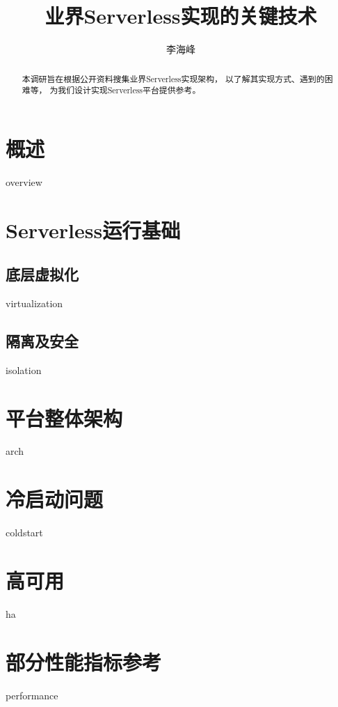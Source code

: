 \documentclass{scrartcl}
\title{业界Serverless实现的关键技术}
\author{李海峰}
\begin{document}
\begin{titlingpage}
\maketitle
\begin{abstract}
    本调研旨在根据公开资料搜集业界Serverless实现架构，
    以了解其实现方式、遇到的困难等，
    为我们设计实现Serverless平台提供参考。
\end{abstract}
\end{titlingpage}
\tableofcontents

\section{概述}
{overview}
\section{Serverless运行基础}
\subsection{底层虚拟化}
{virtualization}
\subsection{隔离及安全}
{isolation}
\section{平台整体架构}
{arch}
\section{冷启动问题}
{coldstart}
\section{高可用}
{ha}
\section{部分性能指标参考}
{performance}

\clearpage
\printbibliography 
\end{document}
